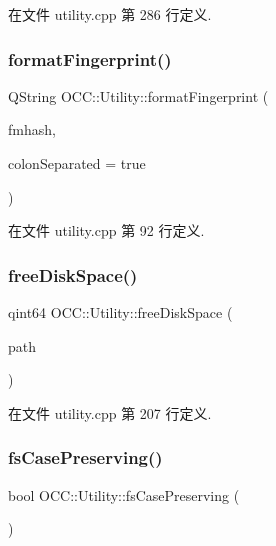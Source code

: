 在文件 utility.\+cpp 第 286 行定义.

\mbox{\label{namespace_o_c_c_1_1_utility_a2a3ee3aad7e4c551758f0bceb7c76172}} 
\subsubsection{\texorpdfstring{format\+Fingerprint()}{formatFingerprint()}}
{\footnotesize\ttfamily Q\+String O\+C\+C\+::\+Utility\+::format\+Fingerprint (\begin{DoxyParamCaption}\item[{const Q\+Byte\+Array \&}]{fmhash,  }\item[{bool}]{colon\+Separated = {\ttfamily true} }\end{DoxyParamCaption})}



在文件 utility.\+cpp 第 92 行定义.

\mbox{\label{namespace_o_c_c_1_1_utility_a0b8741e91bdc3b0209d75c3627308b89}} 
\subsubsection{\texorpdfstring{free\+Disk\+Space()}{freeDiskSpace()}}
{\footnotesize\ttfamily qint64 O\+C\+C\+::\+Utility\+::free\+Disk\+Space (\begin{DoxyParamCaption}\item[{const Q\+String \&}]{path }\end{DoxyParamCaption})}



在文件 utility.\+cpp 第 207 行定义.

\mbox{\label{namespace_o_c_c_1_1_utility_aa60741b25d0d624446071c1e201935ad}} 
\subsubsection{\texorpdfstring{fs\+Case\+Preserving()}{fsCasePreserving()}}
{\footnotesize\ttfamily bool O\+C\+C\+::\+Utility\+::fs\+Case\+Preserving (\begin{DoxyParamCaption}{ }\end{DoxyParamCaption})}



